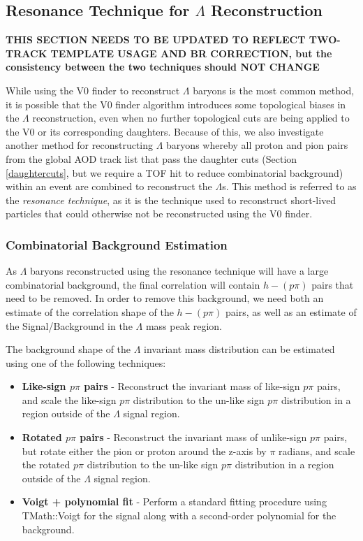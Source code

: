 \documentclass[ALICE,manyauthors]{ALICE_analysis_notes}
\begin{document}
\subsection{Resonance Technique for $\Lambda$ Reconstruction}
\label{resonance_technique}

\textbf{THIS SECTION NEEDS TO BE UPDATED TO REFLECT TWO-TRACK TEMPLATE USAGE AND BR CORRECTION, but the consistency between the two techniques should NOT CHANGE}

While using the V0 finder to reconstruct $\Lambda$ baryons is the most common method, it is possible that the V0 finder algorithm introduces some topological biases in the $\Lambda$ reconstruction, even when no further topological cuts are being applied to the V0 or its corresponding daughters. Because of this, we also investigate another method for reconstructing $\Lambda$ baryons whereby all proton and pion pairs from the global AOD track list that pass the daughter cuts (Section \ref{daughtercuts}, but we require a TOF hit to reduce combinatorial background) within an event are combined to reconstruct the $\Lambda$s. This method is referred to as the \textit{resonance technique}, as it is the technique used to reconstruct short-lived particles that could otherwise not be reconstructed using the V0 finder.

\subsubsection{Combinatorial Background Estimation}
\label{combinatorial_background}

As $\Lambda$ baryons reconstructed using the resonance technique will have a large combinatorial background, the final correlation will contain $h-(p\pi)$ pairs that need to be removed. In order to remove this background, we need both an estimate of the correlation shape of the $h-(p\pi)$ pairs, as well as an estimate of the Signal/Background in the $\Lambda$ mass peak region.

 The background shape of the $\Lambda$ invariant mass distribution can be estimated using one of the following techniques:

 \begin{itemize}
	\item \textbf{Like-sign $p\pi$ pairs} - Reconstruct the invariant mass of like-sign $p\pi$ pairs, and scale the like-sign $p\pi$ distribution to the un-like sign $p\pi$ distribution in a region outside of the $\Lambda$ signal region.
	\item \textbf{Rotated $p\pi$ pairs} - Reconstruct the invariant mass of unlike-sign $p\pi$ pairs, but rotate either the pion or proton around the z-axis by $\pi$ radians, and scale the rotated $p\pi$ distribution to the un-like sign $p\pi$ distribution in a region outside of the $\Lambda$ signal region.
	\item \textbf{Voigt + polynomial fit} - Perform a standard fitting procedure using TMath::Voigt for the signal along with a second-order polynomial for the background.
 \end{itemize}
\end{document}
